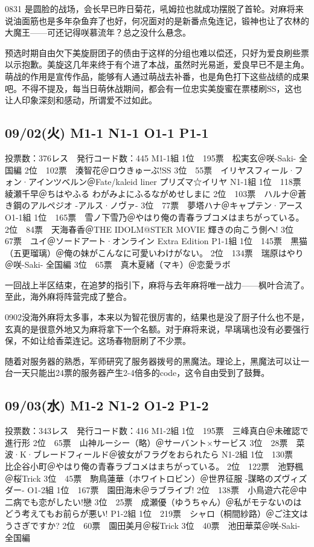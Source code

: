 0831 是圆脸的战场，会长早已昨日菊花，吼姆拉也就成功摆脱了首轮。对麻将来说油面筋也是多年杂鱼弃了也好，何况面对的是新番点兔连记，锻神也让了农林的大魔王——可还记得咲慕流年？总之没什么悬念。

预选时期自由欠下美旋厨团子的债由于这样的分组也难以偿还，只好为爱良刷些票以示抱歉。美旋这几年来终于有个进了本战，虽然时光易逝，爱良早已不是主角。萌战的作用是宣传作品，能够有人通过萌战去补番，也是角色打下这些战绩的成果吧。不得不提及，每当日萌休战期间，都会有一位忠实美旋蜜在票楼刷SS，这也让人印象深刻和感动，所谓爱不过如此。

\subsection{09/02(火) M1-1 N1-1 O1-1 P1-1}

    投票数：376レス　発行コード数：445
    M1-1組
    1位　195票　松実玄＠咲-Saki- 全国編
    2位　102票　湊智花＠ロウきゅーぶ!SS
    3位　55票　イリヤスフィール·フォン·アインツベルン＠Fate/kaleid liner プリズマ☆イリヤ
    N1-1組
    1位　118票　綾瀬千早＠ちはやふる わがみよにふるながめせしまに
    2位　103票　ハルナ＠蒼き鋼のアルペジオ -アルス·ノヴァ-
    3位　77票　夢塔ハナ＠キャプテン·アース
    O1-1組
    1位　165票　雪ノ下雪乃＠やはり俺の青春ラブコメはまちがっている。
    2位　84票　天海春香＠THE IDOLM@STER MOVIE 輝きの向こう側へ!
    3位　67票　ユイ＠ソードアート·オンライン Extra Edition
    P1-1組
    1位　145票　黒猫（五更瑠璃）＠俺の妹がこんなに可愛いわけがない。
    2位　134票　瑞原はやり＠咲-Saki- 全国編
    3位　65票　真木夏緒（マキ）＠恋愛ラボ

一回战上半区结束，在追梦的指引下，麻将与去年麻将唯一战力——枫叶合流了。至此，海外麻将阵营完成了整合。

0902没海外麻将太多事，本来以为智花很厉害的，结果也是没了厨子什么也不是，玄真的是很意外地又为麻将拿下一个名额。对于麻将来说，早璃璃也没有必要强行保，不如让给香菜连记。这场春物厨刷了不少票。

随着对服务器的熟悉，军师研究了服务器拨号的黑魔法。理论上，黑魔法可以让一台一天只能出24票的服务器产生2-4倍多的code，这令自由受到了鼓舞。

\subsection{09/03(水) M1-2 N1-2 O1-2 P1-2}

    投票数：343レス　発行コード数：416
    M1-2組
    1位　195票　三峰真白＠未確認で進行形
    2位　65票　山神ルーシー（略）＠サーバント×サービス
    3位　28票　菜波·K·ブレードフィールド＠彼女がフラグをおられたら
    N1-2組
    1位　130票　比企谷小町＠やはり俺の青春ラブコメはまちがっている。
    2位　122票　池野楓＠桜Trick
    3位　45票　駒鳥蓮華（ホワイトロビン）＠世界征服 -謀略のズヴィズダー-
    O1-2組
    1位　167票　園田海未＠ラブライブ!
    2位　138票　小鳥遊六花＠中二病でも恋がしたい!戀
    3位　25票　成瀬優（ゆうちゃん）＠私がモテないのはどう考えてもお前らが悪い!
    P1-2組
    1位　219票　シャロ（桐間紗路）＠ご注文はうさぎですか?
    2位　60票　園田美月＠桜Trick
    3位　40票　池田華菜＠咲-Saki- 全国編


